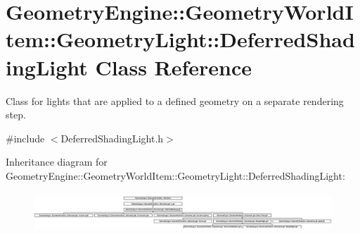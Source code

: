 \hypertarget{class_geometry_engine_1_1_geometry_world_item_1_1_geometry_light_1_1_deferred_shading_light}{}\section{Geometry\+Engine\+::Geometry\+World\+Item\+::Geometry\+Light\+::Deferred\+Shading\+Light Class Reference}
\label{class_geometry_engine_1_1_geometry_world_item_1_1_geometry_light_1_1_deferred_shading_light}


Class for lights that are applied to a defined geometry on a separate rendering step.  




{\ttfamily \#include $<$Deferred\+Shading\+Light.\+h$>$}

Inheritance diagram for Geometry\+Engine\+::Geometry\+World\+Item\+::Geometry\+Light\+::Deferred\+Shading\+Light\+:\begin{figure}[H]
\begin{center}
\leavevmode
\includegraphics[height=1.480176cm]{class_geometry_engine_1_1_geometry_world_item_1_1_geometry_light_1_1_deferred_shading_light}
\end{center}
\end{figure}
